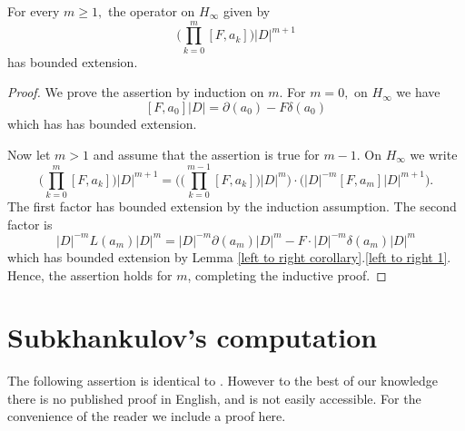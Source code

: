     \begin{lem}\label{c third alert lemma} 
        For every $m\geq1,$ the operator on $H_\infty$ given by
        \begin{equation*}
            \Big(\prod_{k=0}^m[F,a_k]\Big)|D|^{m+1}
        \end{equation*}
        has bounded extension.
    \end{lem}
    \begin{proof} 
        We prove the assertion by induction on $m.$ For $m=0,$ on $H_\infty$ we have
        $$[F,a_0]|D|=\partial(a_0)-F\delta(a_0)$$
        which has has bounded extension.

        Now let $m>1$ and assume that the assertion is true for $m-1$. On $H_\infty$ we write
        $$\Big(\prod_{k=0}^m[F,a_k]\Big)|D|^{m+1} = \Big(\Big(\prod_{k=0}^{m-1}[F,a_k]\Big)|D|^m\Big)\cdot\Big(|D|^{-m}[F,a_m]|D|^{m+1}\Big).$$
        The first factor has bounded extension by the induction assumption. The second factor is
        $$|D|^{-m}L(a_m)|D|^m=|D|^{-m}\partial(a_m)|D|^m-F\cdot|D|^{-m}\delta(a_m)|D|^m$$
        which has bounded extension by Lemma \ref{left to right corollary}.\eqref{left to right 1}. Hence, the assertion holds for $m$, completing the inductive proof.
    \end{proof}

\section{Subkhankulov's computation}\label{subhankulov app}

    The following assertion is identical to \cite[Lemma 2.1.1]{subhankulov}. However to the best of our knowledge there is no published proof in English,
    and \cite{subhankulov} is not easily accessible. For the convenience of the reader we include a proof here.
    
